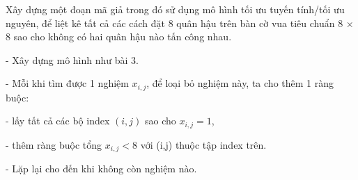 \begin{exercise}{4}{}

    Xây dựng một đoạn mã giả trong đó sử dụng mô hình tối ưu tuyến tính/tối ưu nguyên, để
    liệt kê tất cả các cách đặt 8 quân hậu trên bàn cờ vua tiêu chuẩn 8 × 8 sao cho không có hai
    quân hậu nào tấn công nhau.
    
    \begin{solution}
        - Xây dựng mô hình như bài 3.

        - Mỗi khi tìm được 1 nghiệm ${x_{i,j}}$, 
        để loại bỏ nghiệm này, ta cho thêm 1 ràng buộc:

           - lấy tất cả các bộ index $(i,j)$ sao cho $x_{i,j} = 1$,

           - thêm ràng buộc tổng $x_{i,j} <8$ với (i,j) thuộc tập index trên.
           
        - Lặp lại cho đến khi không còn nghiệm nào.
    \end{solution}
\end{exercise}